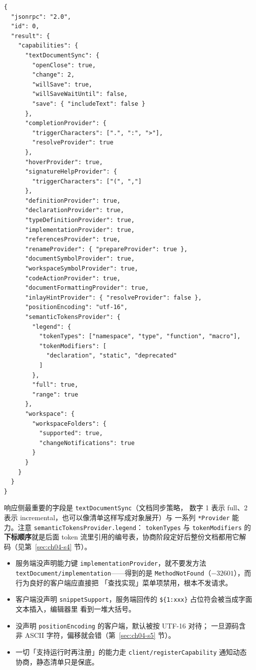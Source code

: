 \documentclass[12pt,a4paper,fontset=fandol]{ctexbook}
\newcommand{\Bk}{\discretionary{}{}{}}
\begin{document}
\begin{lstlisting}[style=jsonstyle,caption={initialize 响应（服务端 $\to$ 客户端）节选},label={lst:ch04-init-resp}]
{
  "jsonrpc": "2.0",
  "id": 0,
  "result": {
    "capabilities": {
      "textDocumentSync": {
        "openClose": true,
        "change": 2,
        "willSave": true,
        "willSaveWaitUntil": false,
        "save": { "includeText": false }
      },
      "completionProvider": {
        "triggerCharacters": [".", ":", ">"],
        "resolveProvider": true
      },
      "hoverProvider": true,
      "signatureHelpProvider": {
        "triggerCharacters": ["(", ","]
      },
      "definitionProvider": true,
      "declarationProvider": true,
      "typeDefinitionProvider": true,
      "implementationProvider": true,
      "referencesProvider": true,
      "renameProvider": { "prepareProvider": true },
      "documentSymbolProvider": true,
      "workspaceSymbolProvider": true,
      "codeActionProvider": true,
      "documentFormattingProvider": true,
      "inlayHintProvider": { "resolveProvider": false },
      "positionEncoding": "utf-16",
      "semanticTokensProvider": {
        "legend": {
          "tokenTypes": ["namespace", "type", "function", "macro"],
          "tokenModifiers": [
            "declaration", "static", "deprecated"
          ]
        },
        "full": true,
        "range": true
      },
      "workspace": {
        "workspaceFolders": {
          "supported": true,
          "changeNotifications": true
        }
      }
    }
  }
}
\end{lstlisting}

响应侧最重要的字段是 \texttt{textDocumentSync}（文档同步策略，
数字 1 表示 full、2 表示 incremental，也可以像清单这样写成对象展开）与
一系列 \texttt{*Provider} 能力。注意 \texttt{semanticTokensProvider.legend}：
\texttt{tokenTypes} 与 \texttt{tokenModifiers} 的\textbf{下标顺序}就是后面
token 流里引用的编号表，协商阶段定好后整份文档都用它解码（见第~\ref{sec:ch04-s4} 节）。

\begin{guideline}[title={能力协商决定后面哪些请求能发}]
\begin{itemize}
  \item 服务端没声明能力键 \texttt{implementation{\Bk}Provider}，就不要发方法
        \texttt{text{\Bk}Document/{\Bk}implementation}\Bk{}——得到的是
        \texttt{Method{\Bk}Not{\Bk}Found}（$-32601$），而行为良好的客户端应直接把
        「查找实现」菜单项禁用，根本不发请求。
  \item 客户端没声明 \texttt{snippet{\Bk}Support}，服务端回传的
        \texttt{\$\{1:xxx\}} 占位符会被当成字面文本插入，编辑器里
        看到一堆大括号。
  \item 没声明 \texttt{positionEncoding} 的客户端，默认被按 UTF-16 对待；
        一旦源码含非 ASCII 字符，偏移就会错（第~\ref{sec:ch04-s5} 节）。
  \item 一切「支持运行时再注册」的能力走
        \texttt{client/registerCapability} 通知动态协商，静态清单只是保底。
\end{itemize}
\end{guideline}
\end{document}
